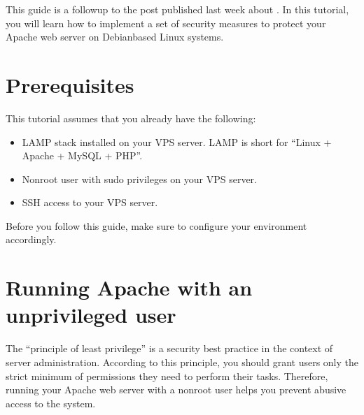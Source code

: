 \documentclass[letterpaper,10pt,english]{sphinxmanual}
\begin{document}
\sphinxAtStartPar
This guide is a follow\sphinxhyphen{}up to the post published last week about {\hyperref[\detokenize{joomla-to-vps::doc}]{}}. In this tutorial, you will learn how to implement a set of security measures to protect your Apache web server on Debian\sphinxhyphen{}based Linux systems.


\section{Prerequisites}
\label{\detokenize{hardening-apache:prerequisites}}
\sphinxAtStartPar
This tutorial assumes that you already have the following:
\begin{itemize}
\item {} 
\sphinxAtStartPar
LAMP stack installed on your VPS server. LAMP is short for “Linux + Apache + MySQL + PHP”.

\item {} 
\sphinxAtStartPar
Non\sphinxhyphen{}root user with sudo privileges on your VPS server.

\item {} 
\sphinxAtStartPar
SSH access to your VPS server.

\end{itemize}

\sphinxAtStartPar
Before you follow this guide, make sure to configure your environment accordingly.


\section{Running Apache with an unprivileged user}
\label{\detokenize{hardening-apache:running-apache-with-an-unprivileged-user}}
\sphinxAtStartPar
The “principle of least privilege” is a security best practice in the context of server administration. According to this principle, you should grant users only the strict minimum of permissions they need to perform their tasks. Therefore, running your Apache web server with a non\sphinxhyphen{}root user helps you prevent abusive access to the system.
\end{document}

